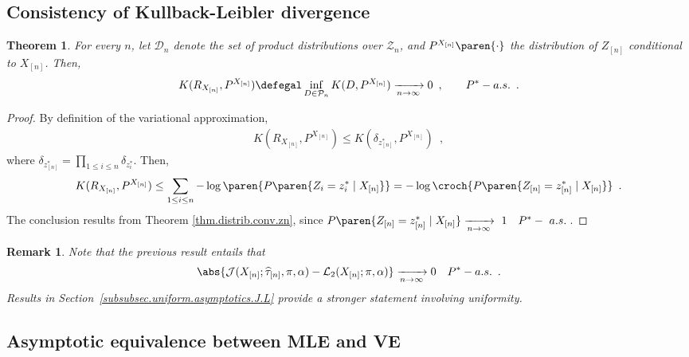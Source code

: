 \documentclass[11pt]{article}
\newtheorem{thm}{Theorem}[section]
\newtheorem{proof}{Proof}%
\newtheorem{rk}{Remark}
\newcommand{\Xn}{X_{[n]}}
\newcommand{\Zn}{Z_{[n]}}
\newcommand{\zn}{z_{[n]}}
\renewcommand{\L}{\mathcal{L}}
\newcommand{\J}{\mathcal{J}}
\newcommand{\tah}{\widehat{\tau}}
\newcommand{\tahn}{\tah_{[n]}}
\begin{document}
\subsection{Consistency of Kullback-Leibler divergence}


\begin{thm} For every $n$, let $\mathcal{D}_n$ denote the set of product distributions over $\mathcal{Z}_n$, and $P^{\Xn}\paren{\cdot}$ the distribution of $\Zn$ conditional to $\Xn$. Then,
\begin{align*}
K(R_{\Xn},P^{\Xn})\defegal \inf_{D\in\mathcal{P}_n} K(D,P^{\Xn}) \xrightarrow[n\to\infty]{}0\enspace,\qquad P^*-a.s. \enspace.
\end{align*}
\end{thm}

\begin{proof} By definition of the variational approximation,
\begin{align*}
        K(R_{\Xn},P^{\Xn})  \leq K(\delta_{\zn^*},P^{\Xn})\enspace,
\end{align*}
where $\delta_{\zn^*}=\prod_{1\leq i\leq n} \delta_{z^*_i}$.
%
Then,
\begin{align*}
        K(R_{\Xn},P^{\Xn})  \leq \sum_{1\leq i\leq n} -\log\paren{P\paren{Z_i=z^*_i \mid \Xn}} = -\log\croch{P\paren{\Zn=\zn^* \mid \Xn}}
     \enspace.
\end{align*}
The conclusion results from Theorem \ref{thm.distrib.conv.zn}, since $P\paren{\Zn=\zn^* \mid \Xn}\xrightarrow[n\to\infty]{}~1\quad P^*-~a.s.\,$.

\end{proof}

\begin{rk}
        Note that the previous result entails that
\begin{align*}
\abs{\J(\Xn; \tahn, \pi, \alpha)-\L_2(\Xn;  \pi, \alpha)}\xrightarrow[n\to\infty]{}0\quad  P^*-a.s. \enspace.   
\end{align*}
%
Results in Section~\ref{subsubsec.uniform.asymptotics.J.L} provide a stronger statement involving uniformity.
\end{rk}







\subsection{Asymptotic equivalence between MLE and VE}
\end{document}
